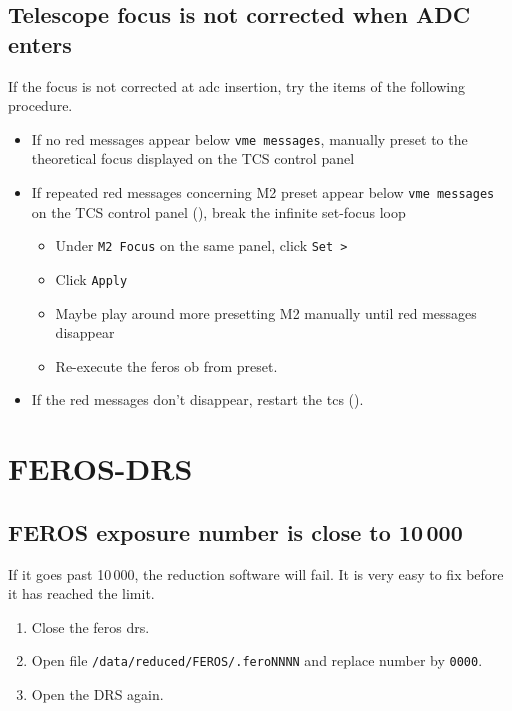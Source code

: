 \documentclass[11pt,fleqn,a4paper]{book}
\begin{document}
\subsection{Telescope focus is not corrected when ADC enters}
\label{sec:focusadc}

If the focus is not corrected at \gls{adc} insertion, try the items of the following procedure.

\begin{itemize}
\item If no red messages appear below \texttt{\gls{vme} messages}, manually
preset to the theoretical \gls{focus} displayed on the \gls{TCS control panel}
\item If repeated red messages concerning M2 preset appear below 
 \texttt{\gls{vme} messages} on the
  \gls{TCS control panel} (), break the infinite set-focus loop
  \begin{itemize} 
    \item Under \texttt{M2 Focus} on the same panel, click \texttt{Set >}
    \item Click \texttt{Apply}  
    \item Maybe play around more \gls{preset}ting M2 manually until red messages
        disappear
    \item Re-execute the \gls{feros} \gls{ob} from preset. 
  \end{itemize}
\item If the red messages don't disappear, restart the \gls{tcs} ().
\end{itemize}

\section{FEROS-DRS}

\subsection{FEROS exposure number is close to 10\,000}

If it goes past 10\,000, the reduction software will fail.  It is very easy to fix before it has reached the limit.
\label{proc:FEROSDRSresetnum}
\begin{enumerate}
    \item Close the \gls{feros} \gls{drs}.
    \item Open file \texttt{/data/reduced/FEROS/.feroNNNN} and replace number by \texttt{0000}.
    \item Open the DRS again.
\end{enumerate}
\end{document}
